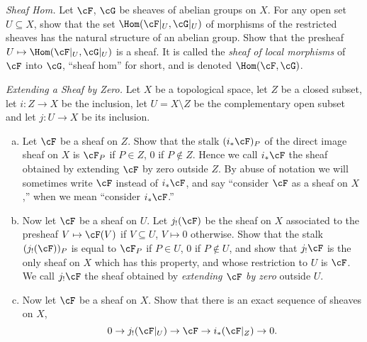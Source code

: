 \begin{homework}[e]
	 \textit{Sheaf Hom.} Let $\cF$, $\cG$ be sheaves of abelian groups on $X$. For any open set $U \subseteq X$, show that the set $\Hom(\cF|_U, \cG|_U)$ of morphisms of the restricted sheaves has the natural structure of an abelian group. Show that the presheaf $U \mapsto \Hom(\cF|_U, \cG|_U)$ is a sheaf. It is called the \textit{sheaf of local morphisms} of $\cF$ into $\cG$, ``sheaf hom'' for short, and is denoted $\Hom(\cF, \cG)$.

	 \textit{Extending a Sheaf by Zero.} Let $X$ be a topological space, let $Z$ be a closed subset, let $i:Z\to X$ be the inclusion, let $U = X \setminus Z$ be the complementary open subset and let $j:U\to X$ be its inclusion.
	\begin{enumerate}[(a)]
		\item Let $\cF$ be a sheaf on $Z$. Show that the stalk $(i_*\cF)_P$ of the direct image sheaf on  $X$ is $\cF_P$ if $P \in Z$, $0$ if $P \not\in Z$. Hence we call $i_* \cF$ the sheaf obtained by extending $\cF$ by zero outside $Z$. By abuse of notation we will sometimes write $\cF$ instead of $i_*\cF$, and say ``consider $\cF$ as a sheaf on $X$,'' when we mean ``consider $i_*\cF$.''
		\item Now let $\cF$ be a sheaf on $U$. Let $j_!(\cF)$ be the sheaf on $X$ associated to the presheaf $V\mapsto \cF(V)$ if $V \subseteq U$, $V \mapsto 0$ otherwise. Show that the stalk $(j_!(\cF))_P$ is equal to $\cF_P$ if $P \in U$, 0 if $P \not\in U$, and show that $j_!\cF$ is the only sheaf on $X$ which has this property, and whose restriction to $U$ is $\cF$. We call $j_!\cF$ the sheaf obtained by \textit{extending $\cF$ by zero} outside $U$. 
		\item Now let  $\cF$ be a sheaf on $X$. Show that there is an exact sequence of sheaves on $X$,
			\[
			0 \to j_!(\cF|_U) \to \cF \to i_*(\cF|_Z) \to 0.
			\]
	\end{enumerate}


\end{homework}
